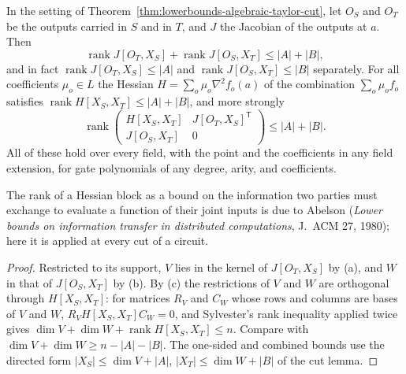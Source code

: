 \begin{theorem}
  \label{thm:lowerbounds-algebraic-taylor-rank}
  \leanok
  In the setting of Theorem~\ref{thm:lowerbounds-algebraic-taylor-cut}, let
  $O_S$ and $O_T$ be the outputs carried in $S$ and in $T$, and $J$ the
  Jacobian of the outputs at $a$. Then
  \[
    \operatorname{rank}J[O_T,X_S]+\operatorname{rank}J[O_S,X_T]\le|A|+|B| ,
  \]
  and in fact $\operatorname{rank}J[O_T,X_S]\le|A|$ and
  $\operatorname{rank}J[O_S,X_T]\le|B|$ separately. For all coefficients
  $\mu_o\in L$ the Hessian
  $H=\sum_o\mu_o\nabla^2f_o(a)$ of the combination $\sum_o\mu_of_o$ satisfies
  $\operatorname{rank}H[X_S,X_T]\le|A|+|B|$, and more strongly
  \[
    \operatorname{rank}\begin{pmatrix}H[X_S,X_T] & J[O_T,X_S]^{\mathsf T}\\
      J[O_S,X_T] & 0\end{pmatrix}\le|A|+|B| .
  \]
  All of these hold over every field,
  with the point and the coefficients in any field extension, for gate
  polynomials of any degree, arity, and coefficients.

  The rank of a Hessian block as a bound on the information two parties
  must exchange to evaluate a function of their joint inputs is due to
  Abelson (\emph{Lower bounds on information transfer in distributed
  computations}, J.~ACM 27, 1980); here it is applied at every cut of a
  circuit.
\end{theorem}
\begin{proof}
  \leanok
  Restricted to its support, $V$ lies in the kernel of $J[O_T,X_S]$ by (a),
  and $W$ in that of $J[O_S,X_T]$ by (b). By (c) the restrictions of $V$ and
  $W$ are orthogonal through $H[X_S,X_T]$: for matrices $R_V$ and $C_W$ whose
  rows and columns are bases of $V$ and $W$, $R_VH[X_S,X_T]C_W=0$, and
  Sylvester's rank inequality applied twice gives
  $\dim V+\dim W+\operatorname{rank}H[X_S,X_T]\le n$. Compare with
  $\dim V+\dim W\ge n-|A|-|B|$. The one-sided and combined bounds use the
  directed form $|X_S|\le\dim V+|A|$, $|X_T|\le\dim W+|B|$ of the cut lemma.
\end{proof}

